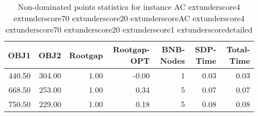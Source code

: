 \begin{table}
\caption{Non-dominated points statistics for instance AC	extunderscore4	extunderscore70	extunderscore20	extunderscoreAC	extunderscore4	extunderscore70	extunderscore20	extunderscore1	extunderscoredetailed}
\label{tab:stats/AC_4_70_20_AC_4_70_20_1_detailed}
\begin{tabular}{rrrrrrr}
\toprule
OBJ1 & OBJ2 & Rootgap & Rootgap-OPT & BNB-Nodes & SDP-Time & Total-Time \\
\midrule
440.50 & 304.00 & 1.00 & -0.00 & 1 & 0.03 & 0.03 \\
668.50 & 253.00 & 1.00 & 0.34 & 5 & 0.07 & 0.07 \\
750.50 & 229.00 & 1.00 & 0.18 & 5 & 0.08 & 0.08 \\
\bottomrule
\end{tabular}
\end{table}
